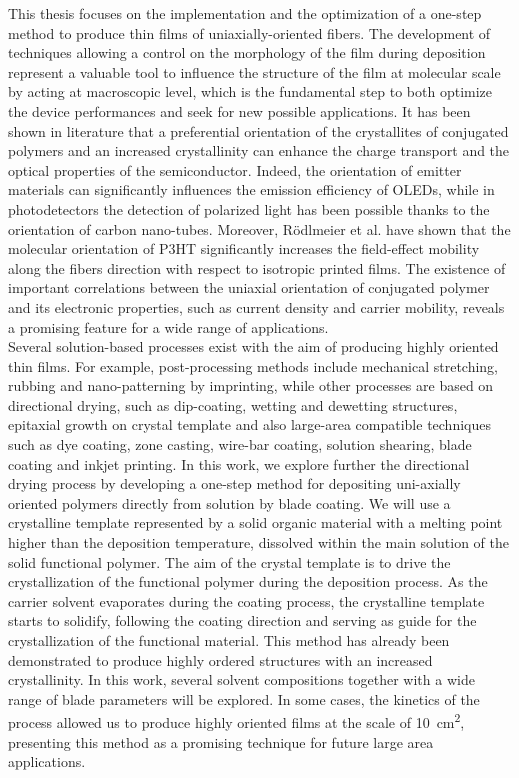 \documentclass  [
  paper    = a4,
  BCOR     = 10mm,
  twoside,
  fontsize = 12pt,
  fleqn,
  toc      = bibnumbered,
  toc      = listofnumbered,
  numbers  = noendperiod,
  headings = normal,
  listof   = leveldown,
  version  = 3.03
]                                       {scrreprt}
\begin{document}
This thesis focuses on the implementation and  the optimization of a one-step method to produce thin films of uniaxially-oriented fibers. The development of techniques allowing a control on the morphology of the film during deposition represent a valuable tool to influence the structure of the film at molecular scale by acting at macroscopic level, which is the fundamental step to both optimize the device performances and seek for new possible applications. It has been shown in literature that a preferential orientation of the crystallites of conjugated polymers and an increased crystallinity can enhance the charge transport and the optical properties of the semiconductor. Indeed, the orientation of emitter materials can significantly influences the emission efficiency of OLEDs\cite{art:orient}, while in photodetectors the detection of polarized light has been possible thanks to the orientation of carbon nano-tubes\cite{art:Orient}. Moreover, R\"odlmeier et al.\cite{art:Tobi} have shown that the molecular orientation of P3HT significantly increases the field-effect mobility along the fibers direction with respect to isotropic printed films. The existence of important correlations between the uniaxial orientation of conjugated polymer and its electronic properties, such as current density and carrier mobility, reveals a promising feature for a wide range of applications.\\

Several solution-based processes exist with the aim of producing highly oriented thin films. For example, post-processing methods include mechanical stretching, rubbing and nano-patterning by imprinting, while other processes are based on directional drying, such as dip-coating, wetting and dewetting structures, epitaxial growth on crystal template and also large-area compatible techniques such as dye coating, zone casting, wire-bar coating, solution shearing, blade coating\cite{art:review}\cite{art:caironi} and inkjet printing\cite{art:Tobi}. In this work, we explore further the directional drying process by developing a one-step method for depositing uni-axially oriented polymers directly from solution by blade coating. We will use a crystalline template represented by a solid organic material with a melting point higher than the deposition temperature, dissolved within the main solution of the solid functional polymer. The aim of the crystal template is to drive the crystallization of the functional polymer during the deposition process. As the carrier solvent evaporates during the coating process, the crystalline template starts to solidify, following the coating direction and serving as guide for the crystallization of the functional material. This method has already been demonstrated to produce highly ordered structures with an increased crystallinity\cite{art:bladecoating}. In this work, several solvent compositions together with a wide range of blade parameters will be explored. In some cases, the kinetics of the process allowed us to produce highly oriented films at the scale of \SI{10}{\square\centi\metre}, presenting this method as a promising technique for future large area applications.\\
\end{document}
